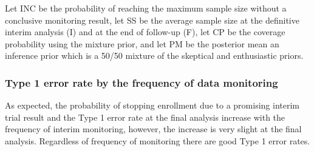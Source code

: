 \documentclass[12pt]{article}
\begin{document}
Let INC be the probability of reaching the maximum sample size without a conclusive monitoring result, let SS be the average sample size at the definitive interim analysis (I) and at the end of follow-up (F), let CP be the coverage probability using the mixture prior, and let PM be the posterior mean an inference prior which is a 50/50 mixture of the skeptical and enthusiastic priors.




\subsubsection{Type 1 error rate by the frequency of data monitoring}
As expected, the probability of stopping enrollment due to a promising interim trial result and the Type 1 error rate at the final analysis increase with the frequency of interim monitoring, however, the increase is very slight at the final analysis. Regardless of frequency of monitoring there are good Type 1 error rates. 
\end{document}
